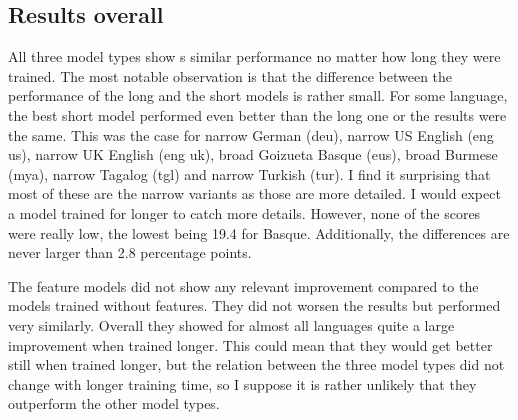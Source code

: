 \subsection{Results overall}
All three model types show s similar performance no matter how long they were trained. The most notable observation is that the difference between the performance of the long and the short models is rather small. For some language, the best short model performed even better than the long one or the results were the same. This was the case for narrow German (deu), narrow US English (eng us), narrow UK English (eng uk), broad Goizueta Basque (eus), broad Burmese (mya), narrow Tagalog (tgl) and narrow Turkish (tur). I find it surprising that most of these are the narrow variants as those are more detailed. I would expect a model trained for longer to catch more details. However, none of the scores were really low, the lowest being 19.4 for Basque. Additionally, the differences are never larger than 2.8 percentage points.

The feature models did not show any relevant improvement compared to the models trained without features. They did not worsen the results but performed very similarly. Overall they showed for almost all languages quite a large improvement when trained longer. This could mean that they would get better still when trained longer, but the relation between the three model types did not change with longer training time, so I suppose it is rather unlikely that they outperform the other model types.





